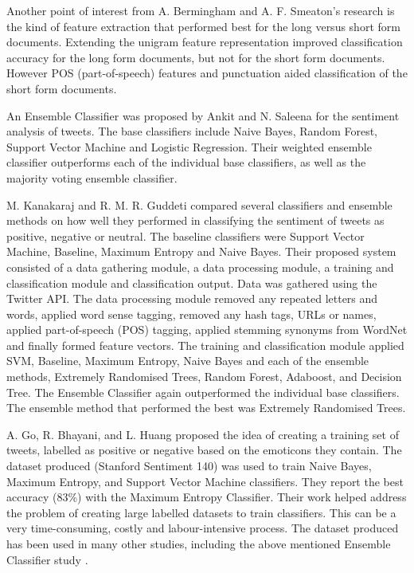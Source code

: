 Another point of interest from A. Bermingham and A. F. Smeaton's research is the kind of feature extraction that performed best for the long versus short form documents. Extending the unigram feature representation improved classification accuracy for the long form documents, but not for the short form documents. However POS (part-of-speech) features and punctuation aided classification of the short form documents. 

An Ensemble Classifier was proposed by Ankit and N. Saleena \cite{Ankit2018} for the sentiment analysis of tweets. The base classifiers include Naive Bayes, Random Forest, Support Vector Machine and Logistic Regression. Their weighted ensemble classifier outperforms each of the individual base classifiers, as well as the majority voting ensemble classifier.

M. Kanakaraj and R. M. R. Guddeti \cite{Kanakaraj2015} compared several classifiers and ensemble methods on how well they performed in classifying the sentiment of tweets as positive, negative or neutral. The baseline classifiers were Support Vector Machine, Baseline, Maximum Entropy and Naive Bayes. Their proposed system consisted of a data gathering module, a data processing module, a training and classification module and classification output. Data was gathered using the Twitter API. The data processing module removed any repeated letters and words, applied word sense tagging, removed any hash tags, URLs or names, applied part-of-speech (POS) tagging, applied stemming synonyms from WordNet and finally formed feature vectors. The training and classification module applied SVM, Baseline, Maximum Entropy, Naive Bayes and each of the ensemble methods, Extremely Randomised Trees, Random Forest, Adaboost, and Decision Tree. The Ensemble Classifier again outperformed the individual base classifiers. The ensemble method that performed the best was Extremely Randomised Trees. 

A. Go, R. Bhayani, and L. Huang \cite{Go2009} proposed the  idea of creating a training set of tweets, labelled as positive or negative based on the emoticons they contain. The dataset produced (Stanford Sentiment 140) was used to train Naive Bayes, Maximum Entropy, and Support Vector Machine classifiers. They report the best accuracy (83\%) with the Maximum Entropy Classifier. Their work helped address the problem of creating large labelled datasets to train classifiers. This can be a very time-consuming, costly and labour-intensive process. The dataset produced has been used in many other studies, including the above mentioned Ensemble Classifier study \cite{Ankit2018}.

